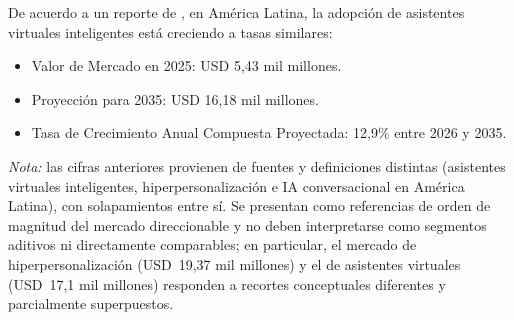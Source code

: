 De acuerdo a un reporte de \textcite{informes_expertos_latam_2024}, en América Latina, la adopción de asistentes virtuales inteligentes está creciendo a tasas similares:

\begin{itemize}
    \item Valor de Mercado en 2025: USD 5,43 mil millones.
    \item Proyección para 2035: USD 16,18 mil millones.
    \item Tasa de Crecimiento Anual Compuesta Proyectada: 12,9\% entre 2026 y 2035.
\end{itemize}

\noindent\textit{Nota:} las cifras anteriores provienen de fuentes y definiciones distintas (asistentes virtuales inteligentes, hiperpersonalización e IA conversacional en América Latina), con solapamientos entre sí. Se presentan como referencias de orden de magnitud del mercado direccionable y no deben interpretarse como segmentos aditivos ni directamente comparables; en particular, el mercado de hiperpersonalización (USD~19,37 mil millones) y el de asistentes virtuales (USD~17,1 mil millones) responden a recortes conceptuales diferentes y parcialmente superpuestos. 